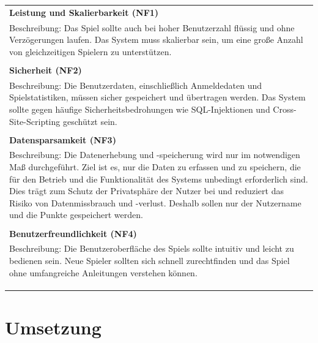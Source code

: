 \documentclass[
]{article}
\begin{document}
\begin{center}
  \begin{tabular}{|p{\linewidth}|}
    \hline
    \textbf{Leistung und Skalierbarkeit (NF1)} \\
    Beschreibung: Das Spiel sollte auch bei hoher Benutzerzahl flüssig und ohne Verzögerungen laufen. Das System muss skalierbar sein, um eine große Anzahl von gleichzeitigen Spielern zu unterstützen. \\ \\
    \hline
    \textbf{Sicherheit (NF2)} \\
    Beschreibung: Die Benutzerdaten, einschließlich Anmeldedaten und Spielstatistiken, müssen sicher gespeichert und übertragen werden. Das System sollte gegen häufige Sicherheitsbedrohungen wie SQL-Injektionen und Cross-Site-Scripting geschützt sein.\\ \\
    \hline
    \textbf{Datensparsamkeit (NF3)} \\
     Beschreibung:
     Die Datenerhebung und -speicherung wird nur im notwendigen Maß durchgeführt. 
     Ziel ist es, nur die Daten zu erfassen und zu speichern, die für den Betrieb und die Funktionalität des Systems unbedingt erforderlich sind. 
     Dies trägt zum Schutz der Privatsphäre der Nutzer bei und reduziert das Risiko von Datenmissbrauch und -verlust.
     Deshalb sollen nur der Nutzername und die Punkte gespeichert werden.
    \\ \\
    \hline
    \textbf{Benutzerfreundlichkeit (NF4)} \\
    Beschreibung: Die Benutzeroberfläche des Spiels sollte intuitiv und leicht zu bedienen sein. Neue Spieler sollten sich schnell zurechtfinden und das Spiel ohne umfangreiche Anleitungen verstehen können.\\ \\
    \\ \\
    \hline
  \end{tabular}
\end{center}

\section{Umsetzung}
\end{document}
